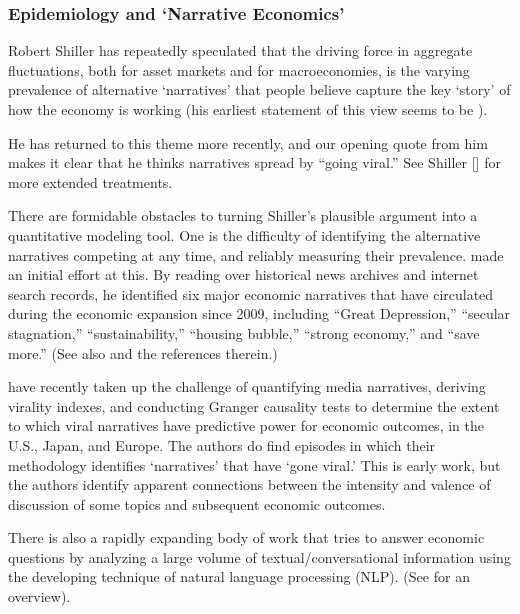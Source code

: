 
\subsubsection{Epidemiology and `Narrative Economics'}\label{narrativeApproach}

Robert Shiller has repeatedly speculated that the driving force in aggregate fluctuations, both for asset markets and for macroeconomies, is the varying prevalence of alternative `narratives' that people believe capture the key `story' of how the economy is working (his earliest statement of this view seems to be \href{https://www.jstor.org/stable/2117915}{\cite{shiller1995conversation}}).

He has returned to this theme more recently, and our opening quote from him makes it clear that he thinks narratives spread by ``going viral.''  See Shiller [\citeyear{shiller2017narrative,shiller_narrative_2019}] for more extended treatments.

There are formidable obstacles to turning Shiller's plausible argument into a quantitative modeling tool.  One is the difficulty of identifying the alternative narratives competing at any time, and reliably measuring their prevalence.
\href{https://github.com/iworld1991/EpiExp/blob/master/Literature/shiller2020popular.pdf}{\cite{shiller2020popular}} made an initial effort at this.  By reading over historical news archives and internet search records, he identified six major economic narratives that have circulated during the economic expansion since 2009, including ``Great Depression,'' ``secular stagnation,'' ``sustainability,'' ``housing bubble,'' ``strong economy,'' and ``save more.''  (See also  \cite{ash2021text} and the references therein.)

\cite{larsen2019business} have recently taken up the challenge of quantifying media narratives, deriving virality indexes, and conducting Granger causality tests to determine the extent to which viral narratives have predictive power for economic outcomes, in the U.S., Japan, and Europe.  The authors do find episodes in which their methodology identifies `narratives' that have `gone viral.'  This is early work, but the authors identify apparent connections between the intensity and valence of discussion of some topics and subsequent economic outcomes.

There is also a rapidly expanding body of work that tries to answer economic questions by analyzing a large volume of textual/conversational information using the developing technique of natural language processing (NLP).  (See \cite{gentzkow2019text} for an overview).

